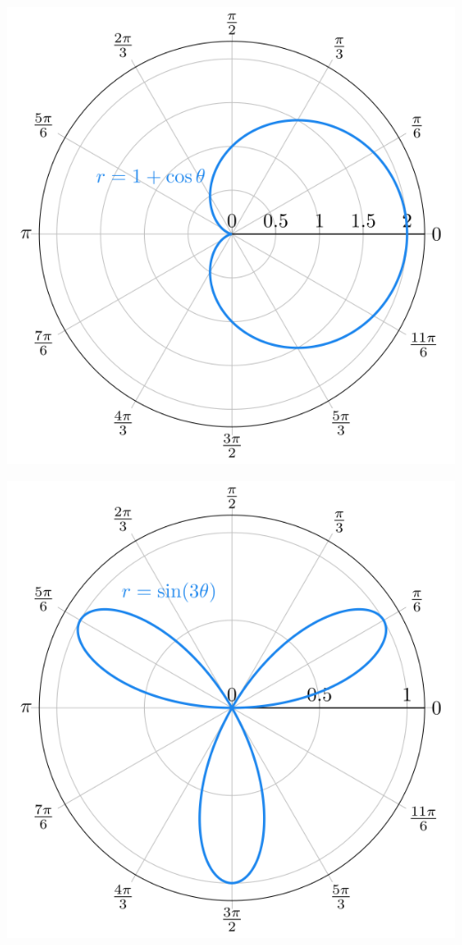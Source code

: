 \documentclass[
  12pt,
  oneside]{book}
\theoremstyle{definition}
\theoremstyle{definition}
\theoremstyle{definition}
\theoremstyle{definition}
\theoremstyle{remark}
\begin{document}
\begin{center}\includegraphics{t18-polar-pics-6} \end{center}

\begin{center}\includegraphics{t18-polar-pics-7} \end{center}
\end{document}
